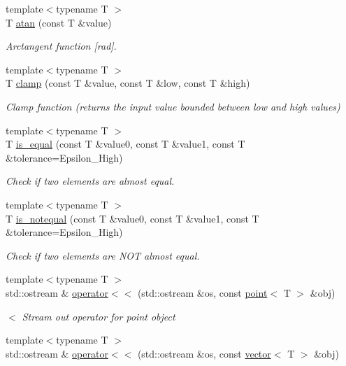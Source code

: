 \begin{DoxyCompactItemize}
{\footnotesize template$<$typename T $>$ }\\T \hyperlink{namespaceddd_a750f7cad6893bbbfbaa51353044bde4f}{atan} (const T \&value)
\begin{DoxyCompactList}\small\item\em Arctangent function \mbox{[}rad\mbox{]}. \end{DoxyCompactList}\item 
{\footnotesize template$<$typename T $>$ }\\T \hyperlink{namespaceddd_a070060e53a22cb16f07576bfb5c4b1cc}{clamp} (const T \&value, const T \&low, const T \&high)
\begin{DoxyCompactList}\small\item\em Clamp function (returns the input value bounded between low and high values) \end{DoxyCompactList}\item 
{\footnotesize template$<$typename T $>$ }\\T \hyperlink{namespaceddd_a7d68733d32a94776596a8e213ae9fcdf}{is\+\_\+equal} (const T \&value0, const T \&value1, const T \&tolerance=Epsilon\+\_\+\+High)
\begin{DoxyCompactList}\small\item\em Check if two elements are almost equal. \end{DoxyCompactList}\item 
{\footnotesize template$<$typename T $>$ }\\T \hyperlink{namespaceddd_a9b12e82fa10b6beadb08360007e6b57b}{is\+\_\+notequal} (const T \&value0, const T \&value1, const T \&tolerance=Epsilon\+\_\+\+High)
\begin{DoxyCompactList}\small\item\em Check if two elements are N\+OT almost equal. \end{DoxyCompactList}\item 
{\footnotesize template$<$typename T $>$ }\\std\+::ostream \& \hyperlink{namespaceddd_a02d73e2ba5a018e4e525deb8aea3c0a8}{operator$<$$<$} (std\+::ostream \&os, const \hyperlink{classddd_1_1point}{point}$<$ T $>$ \&obj)
\begin{DoxyCompactList}\small\item\em $<$ Stream out operator for point object \end{DoxyCompactList}\item 
{\footnotesize template$<$typename T $>$ }\\std\+::ostream \& \hyperlink{namespaceddd_a85783ffbd6985b1981059732d7bbe174}{operator$<$$<$} (std\+::ostream \&os, const \hyperlink{classddd_1_1vector}{vector}$<$ T $>$ \&obj)

\end{DoxyCompactItemize}
